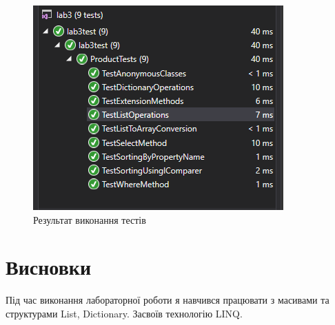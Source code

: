 \documentclass[oneside,14pt]{extarticle}
\begin{document}
\begin{normalsize}
	
	\begin{figure}[H]
		\centering
		\includegraphics[width=\textwidth]{0}
		\caption{Результат виконання тестів}
	\end{figure}
	
	
	\section*{Висновки}
	   Під час виконання лабораторної роботи я навчився працювати з масивами та структурами List, Dictionary.
	   Засвоїв технологію LINQ.
\end{normalsize}
\end{document}
